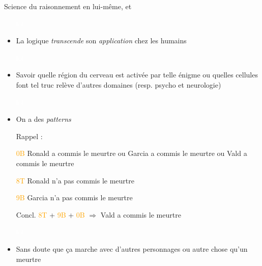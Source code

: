 \begin{frame}
	\begin{description}[labelindent=6pt,style=multiline,leftmargin=1.3in]
		 \setlength\itemsep{1.4em}
	  \item[Larousse] Science du raisonnement en lui-même,  et \pause\pause
	\end{description}

\begin{itemize}
\item[] \textcolor{white}{lol}
\item La logique \textit{transcende} son \textit{application} chez les humains\pause
\item[] \textcolor{white}{lol} 	
\item Savoir quelle région du cerveau est activée par telle énigme ou quelles cellules font tel truc relève d'autres domaines (resp. psycho et neurologie)\pause\pause
\item[] \textcolor{white}{lol}
\item On a des \textit{patterns}
\end{itemize}

\end{frame}
 	


\begin{frame}

\begin{itemize}

\item[] Rappel : 

     \item[\textcolor{orange}{0B}] Ronald a commis le meurtre ou Garcia a commis le meurtre ou Vald a commis le meurtre

        \item[\textcolor{orange}{8T}] Ronald n'a pas commis le meurtre
     \item[\textcolor{orange}{9B}] Garcia n'a pas commis le meurtre
\pause
     \item[Concl.] \textcolor{orange}{8T} + \textcolor{orange}{9B} + \textcolor{orange}{0B} $\Rightarrow$ Vald a commis le meurtre\pause
     
     \item[] \textcolor{white}{lol}
     \item Sans doute que ça marche avec d'autres personnages ou autre chose qu'un meurtre
   
\end{itemize}
\end{frame}
 	
